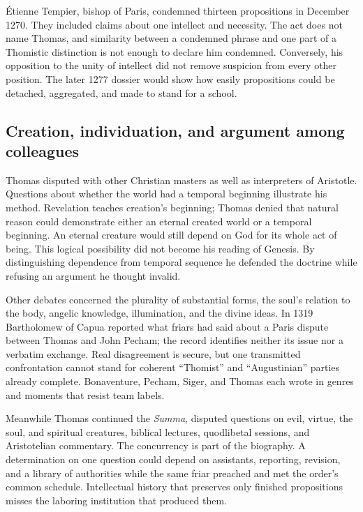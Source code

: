 Étienne Tempier, bishop of Paris, condemned thirteen propositions in December
1270.  They included claims about one intellect and necessity.  The act does
not name Thomas, and similarity between a condemned phrase and one part of a
Thomistic distinction is not enough to declare him condemned.  Conversely,
his opposition to the unity of intellect did not remove suspicion from every
other position.  The later 1277 dossier would show how easily propositions
could be detached, aggregated, and made to stand for a school.

\subsection{Creation, individuation, and argument among colleagues}

Thomas disputed with other Christian masters as well as interpreters of
Aristotle.  Questions about whether the world had a temporal beginning
illustrate his method.  Revelation teaches creation's beginning; Thomas denied
that natural reason could demonstrate either an eternal created world or a
temporal beginning.  An eternal creature would still depend on God for its
whole act of being.  This logical possibility did not become his reading of
Genesis.  By distinguishing dependence from temporal sequence he defended the
doctrine while refusing an argument he thought invalid.

Other debates concerned the plurality of substantial forms, the soul's
relation to the body, angelic knowledge, illumination, and the divine ideas.
In 1319 Bartholomew of Capua reported what friars had said about a Paris dispute
between Thomas and John Pecham; the record identifies neither its issue nor a
verbatim exchange.  Real disagreement is secure, but one transmitted
confrontation cannot stand for coherent ``Thomist'' and ``Augustinian'' parties
already complete.  Bonaventure, Pecham, Siger, and Thomas each wrote in genres
and moments that resist team labels.

Meanwhile Thomas continued the \emph{Summa}, disputed questions on evil,
virtue, the soul, and spiritual creatures, biblical lectures, quodlibetal
sessions, and Aristotelian commentary.  The concurrency is part of the
biography.  A determination on one question could depend on assistants,
reporting, revision, and a library of authorities while the same friar preached
and met the order's common schedule.  Intellectual history that preserves only
finished propositions misses the laboring institution that produced them.
